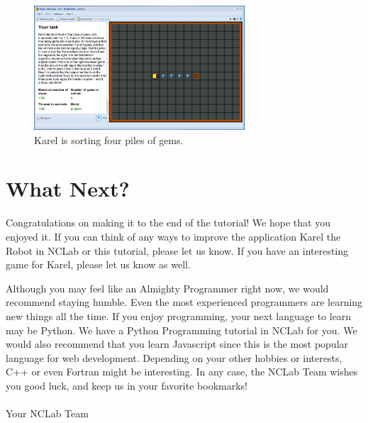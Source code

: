 \documentclass[article,A4,12pt]{llncs}
\begin{document}
\newpage 

\begin{figure}[!ht]
\begin{center}
\includegraphics[width=0.7\textwidth]{img/g13.png}
\end{center}
\vspace{-4mm}
\caption{Karel is sorting four piles of gems.}
\label{fig:g13}
\vspace{-4mm}
\end{figure}
\noindent








\section{What Next?}

Congratulations on making it to the end of the tutorial! We hope that you
enjoyed it. If you can think of any ways to improve the application 
Karel the Robot in NCLab or this tutorial, please let us know. If you 
have an interesting game for Karel, please let us know as well. 

Although you may feel like an Almighty Programmer right now, we would
recommend staying humble. Even the most experienced programmers are
learning new things all the time. If you enjoy programming, your next 
language to learn may be Python. We have a Python Programming tutorial
in NCLab for you. We would also recommend that you learn Javascript since this 
is the most popular language for web development. Depending on your 
other hobbies or interests, C++ or even Fortran might be interesting. 
In any case, the NCLab Team wishes you good luck, and keep us in your 
favorite bookmarks!\\
\\
\hbox{} \hfill Your NCLab Team
\end{document}
